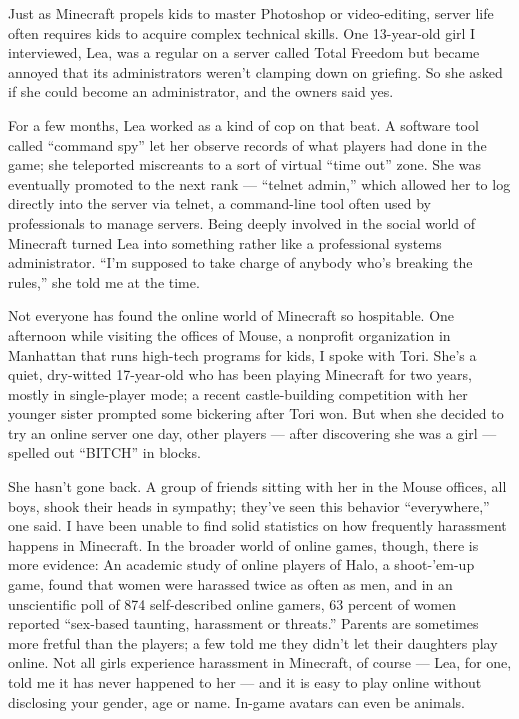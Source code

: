 Just as Minecraft propels kids to master Photoshop or video-­editing,
server life often requires kids to acquire complex technical skills. One
13-year-old girl I interviewed, Lea, was a regular on a server called
Total Freedom but became annoyed that its administrators weren't
clamping down on griefing. So she asked if she could become an
administrator, and the owners said yes.

For a few months, Lea worked as a kind of cop on that beat. A software
tool called ``command spy'' let her observe records of what players had
done in the game; she teleported miscreants to a sort of virtual ``time
out'' zone. She was eventually promoted to the next rank --- ``telnet
admin,'' which allowed her to log directly into the server via telnet, a
command-­line tool often used by professionals to manage servers. Being
deeply involved in the social world of Minecraft turned Lea into
something rather like a professional systems administrator. ``I'm
supposed to take charge of anybody who's breaking the rules,'' she told
me at the time.

Not everyone has found the online world of Minecraft so hospitable. One
afternoon while visiting the offices of Mouse, a nonprofit organization
in Manhattan that runs high-tech programs for kids, I spoke with Tori.
She's a quiet, dry-­witted 17-year-old who has been playing Minecraft
for two years, mostly in single-­player mode; a recent castle-­building
competition with her younger sister prompted some bickering after Tori
won. But when she decided to try an online server one day, other players
--- after discovering she was a girl --- spelled out ``BITCH'' in
blocks.

She hasn't gone back. A group of friends sitting with her in the Mouse
offices, all boys, shook their heads in sympathy; they've seen this
behavior ``everywhere,'' one said. I have been unable to find solid
statistics on how frequently harassment happens in Minecraft. In the
broader world of online games, though, there is more evidence: An
academic study of online players of Halo, a shoot-'em-up game, found
that women were harassed twice as often as men, and in an unscientific
poll of 874 self-­described online gamers, 63 percent of women reported
``sex-­based taunting, harassment or threats.'' Parents are sometimes
more fretful than the players; a few told me they didn't let their
daughters play online. Not all girls experience harassment in Minecraft,
of course --- Lea, for one, told me it has never happened to her --- and
it is easy to play online without disclosing your gender, age or name.
In-game avatars can even be animals.

